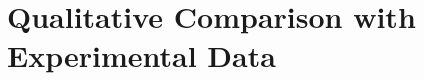 \documentclass[11pt]{article}
\begin{document}




\section{Qualitative Comparison with Experimental Data}

 
\end{document}
